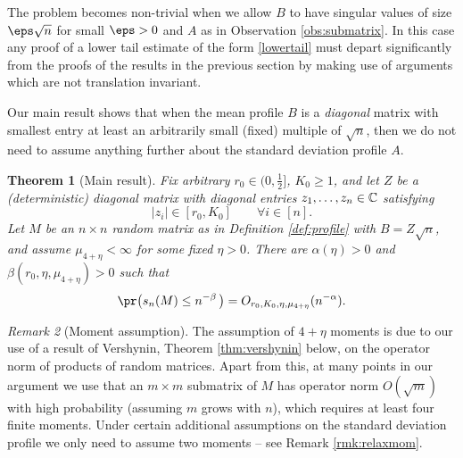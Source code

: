 \documentclass[aop,preprint]{imsart}
\theoremstyle{plain}
\newtheorem{theorem}{Theorem}[section]
\theoremstyle{definition}
\theoremstyle{remark}
\newtheorem{remark}[theorem]{Remark}
\numberwithin{equation}{section}
\numberwithin{theorem}{section}
\begin{document}
The problem becomes non-trivial when we allow $B$ to have singular values of size $\eps \sqrt{n}$ for small $\eps>0$ and $A$ as in Observation \ref{obs:submatrix}. 
In this case any proof of a lower tail estimate of the form \eqref{lowertail} must depart significantly from the proofs of the results in the previous section by making use of arguments which are not translation invariant.

Our main result shows that when the mean profile $B$ is a \emph{diagonal} matrix with smallest entry at least an arbitrarily small (fixed) multiple of $\sqrt{n}$, then we do not need to assume anything further about the standard deviation profile $A$.

\begin{theorem}[Main result]
\label{thm:main}
Fix arbitrary $r_0\in (0,\frac12]$, $K_0\ge1$, and let $Z$ be a (deterministic) diagonal matrix with diagonal entries $z_1,\dots,z_n\in {\mathbb C}$ satisfying 
\begin{equation}	\label{constraint:zi}
 |z_i|\in [r_0,K_0]\qquad \forall i\in[n].
\end{equation}
Let $M$ be an $n\times n$ random matrix as in Definition \ref{def:profile} with $B=Z\sqrt{n}$, and assume $\mu_{4+\eta}<\infty$ for some fixed $\eta>0$.
There are $\alpha(\eta)>0$ and $\beta(r_0,\eta,\mu_{4+\eta})>0$ such that
\begin{equation}	\label{bd:gen}
\pr\big( s_n(M)\le n^{-\beta} \, \big) = O_{r_0,K_0,\eta,\mu_{4+\eta}}(n^{-\alpha}).
\end{equation}
%
\end{theorem}

\begin{remark}[Moment assumption]	
The assumption of $4+\eta$ moments is due to our use of a result of Vershynin, Theorem \ref{thm:vershynin} below, on the operator norm of products of random matrices. 
Apart from this, at many points in our argument we use that an $m\times m$ submatrix of $M$ has operator norm $O(\sqrt{m})$ with high probability (assuming $m$ grows with $n$), which requires at least four finite moments. 
Under certain additional assumptions on the standard deviation profile we only need to assume two moments -- see Remark \ref{rmk:relaxmom}.
\end{remark}
\end{document}
